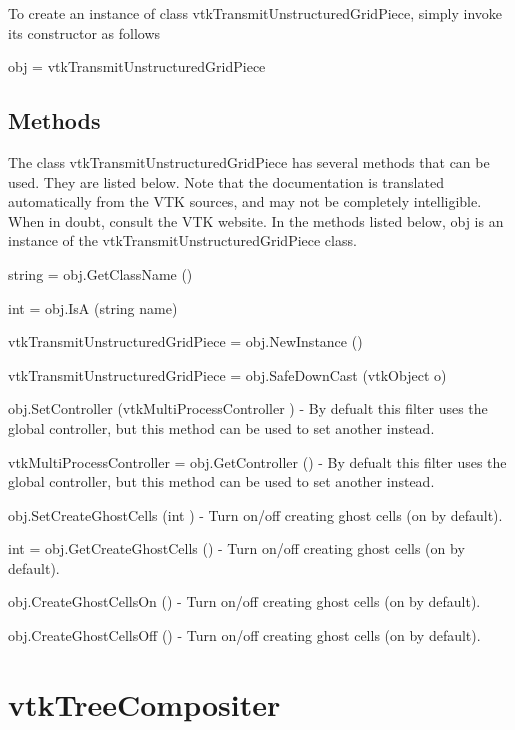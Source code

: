 To create an instance of class vtk\-Transmit\-Unstructured\-Grid\-Piece, simply invoke its constructor as follows \begin{DoxyVerb}  obj = vtkTransmitUnstructuredGridPiece
\end{DoxyVerb}
 \hypertarget{vtkwidgets_vtkxyplotwidget_Methods}{}\subsection{Methods}\label{vtkwidgets_vtkxyplotwidget_Methods}
The class vtk\-Transmit\-Unstructured\-Grid\-Piece has several methods that can be used. They are listed below. Note that the documentation is translated automatically from the V\-T\-K sources, and may not be completely intelligible. When in doubt, consult the V\-T\-K website. In the methods listed below, {\ttfamily obj} is an instance of the vtk\-Transmit\-Unstructured\-Grid\-Piece class. 
\begin{DoxyItemize}
\item {\ttfamily string = obj.\-Get\-Class\-Name ()}  
\item {\ttfamily int = obj.\-Is\-A (string name)}  
\item {\ttfamily vtk\-Transmit\-Unstructured\-Grid\-Piece = obj.\-New\-Instance ()}  
\item {\ttfamily vtk\-Transmit\-Unstructured\-Grid\-Piece = obj.\-Safe\-Down\-Cast (vtk\-Object o)}  
\item {\ttfamily obj.\-Set\-Controller (vtk\-Multi\-Process\-Controller )} -\/ By defualt this filter uses the global controller, but this method can be used to set another instead.  
\item {\ttfamily vtk\-Multi\-Process\-Controller = obj.\-Get\-Controller ()} -\/ By defualt this filter uses the global controller, but this method can be used to set another instead.  
\item {\ttfamily obj.\-Set\-Create\-Ghost\-Cells (int )} -\/ Turn on/off creating ghost cells (on by default).  
\item {\ttfamily int = obj.\-Get\-Create\-Ghost\-Cells ()} -\/ Turn on/off creating ghost cells (on by default).  
\item {\ttfamily obj.\-Create\-Ghost\-Cells\-On ()} -\/ Turn on/off creating ghost cells (on by default).  
\item {\ttfamily obj.\-Create\-Ghost\-Cells\-Off ()} -\/ Turn on/off creating ghost cells (on by default).  
\end{DoxyItemize}\hypertarget{vtkparallel_vtktreecompositer}{}\section{vtk\-Tree\-Compositer}\label{vtkparallel_vtktreecompositer}
